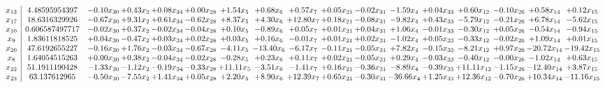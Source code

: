 \documentclass[9pt]{article}
\begin{document}
 \[\begin{array}{c| c c@{\hskip 2pt} c@{\hskip 2pt} c@{\hskip 2pt} c@{\hskip 2pt} c@{\hskip 2pt} c@{\hskip 2pt} c@{\hskip 2pt} c@{\hskip 2pt} c@{\hskip 2pt} c@{\hskip 2pt} c@{\hskip 2pt} c@{\hskip 2pt} c@{\hskip 2pt} c@{\hskip 2pt} c@{\hskip 2pt} }
 x_{13}   &  4.48595954397 & -0.10 x_{30} & +  0.43 x_{2} & +  0.08 x_{34} & +  0.00 x_{28} & +  1.54 x_{5} & +  0.68 x_{6} & +  0.57 x_{7} & +  0.05 x_{21} & -0.02 x_{31} & -1.59 x_{4} & +  0.04 x_{33} & +  0.60 x_{12} & -0.10 x_{26} & +  0.58 x_{14} & +  0.12 x_{15}\\
 x_{17}   &  18.6316329926 & -0.67 x_{30} & +  9.31 x_{2} & +  0.61 x_{34} & -0.62 x_{28} & +  8.37 x_{5} & +  4.30 x_{6} & + 12.80 x_{7} & +  0.18 x_{21} & -0.08 x_{31} & -9.82 x_{4} & +  0.43 x_{33} & -5.79 x_{12} & -0.21 x_{26} & +  6.78 x_{14} & -5.62 x_{15}\\
 x_{10}   &  0.606587497717 & -0.02 x_{30} & +  0.37 x_{2} & -0.02 x_{34} & -0.04 x_{28} & +  0.10 x_{5} & -0.89 x_{6} & +  0.05 x_{7} & +  0.01 x_{21} & +  0.04 x_{31} & +  1.06 x_{4} & -0.01 x_{33} & -0.30 x_{12} & +  0.05 x_{26} & -0.54 x_{14} & -0.94 x_{15}\\
 x_{9}   &  1.83611818525 & +  0.04 x_{30} & -0.47 x_{2} & +  0.03 x_{34} & +  0.02 x_{28} & +  0.03 x_{5} & +  0.16 x_{6} & -0.01 x_{7} & +  0.01 x_{21} & +  0.02 x_{31} & -1.02 x_{4} & +  0.05 x_{33} & -0.33 x_{12} & -0.02 x_{26} & +  1.09 x_{14} & +  0.01 x_{15}\\
 x_{20}   &  47.6192655227 & -0.16 x_{30} & +  1.76 x_{2} & -0.03 x_{34} & -0.67 x_{28} & -4.11 x_{5} & -13.40 x_{6} & -6.17 x_{7} & -0.11 x_{21} & -0.05 x_{31} & +  7.82 x_{4} & -0.15 x_{33} & -8.21 x_{12} & +  0.97 x_{26} & -20.72 x_{14} & -19.42 x_{15}\\
 x_{8}   &  1.64054515263 & +  0.00 x_{30} & +  0.38 x_{2} & -0.04 x_{34} & -0.02 x_{28} & -0.28 x_{5} & +  0.23 x_{6} & +  0.11 x_{7} & +  0.02 x_{21} & -0.05 x_{31} & +  0.29 x_{4} & -0.03 x_{33} & -0.40 x_{12} & -0.00 x_{26} & -1.02 x_{14} & +  0.63 x_{15}\\
 x_{22}   &  51.1911190428 & -1.33 x_{30} & -1.12 x_{2} & -0.19 x_{34} & -0.33 x_{28} & + 11.11 x_{5} & -3.51 x_{6} & -1.41 x_{7} & +  0.16 x_{21} & -0.36 x_{31} & -8.89 x_{4} & -0.39 x_{33} & + 11.11 x_{12} & -1.15 x_{26} & -12.40 x_{14} & +  3.87 x_{15}\\
 x_{23}   &  63.137612965 & -0.50 x_{30} & -7.55 x_{2} & +  1.41 x_{34} & +  0.05 x_{28} & +  2.20 x_{5} & +  8.90 x_{6} & + 12.39 x_{7} & +  0.65 x_{21} & -0.30 x_{31} & -36.66 x_{4} & +  1.25 x_{33} & + 12.36 x_{12} & -0.70 x_{26} & + 10.34 x_{14} & -11.16 x_{15}\\

\end{array}\]
\end{document}

